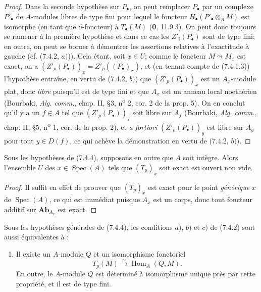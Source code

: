 \begin{proof}
Dans la seconde hypothèse sur $P_\bullet$, on peut remplacer $P_\bullet$ par
un complexe $P'_\bullet$ de
$A$-modules libres de type fini pour lequel le foncteur
$H_\bullet(P'_\bullet\otimes_A M)$ est isomorphe (en tant que
$\partial$-foncteur) à $T_\bullet(M)$ (\textbf{0}, 11.9.3). On peut donc toujours se
ramener à la première hypothèse et dans ce cas les $Z'_i(P_\bullet)$ sont de
type fini; en outre, on peut se borner à démontrer les assertions relatives à
l'exactitude à gauche (cf. (7.4.2, $a)$)). Cela étant, soit $x\in U$; comme le
foncteur $M\leadsto M_x$ est exact, on a
$(Z'_p(P_\bullet))_x=Z'_p((P_\bullet)_x)$,
et (en tenant compte de (7.4.1.3)) l'hypothèse entraîne, en vertu de
(7.4.2, $b)$) que $(Z'_p(P_\bullet))_x$ est un $A_x$-module plat, donc \emph{libre}
puisqu'il est de type fini et que $A_x$ est un anneau local noethérien
(Bourbaki, \emph{Alg. comm.}, chap. II, \S 3, n\textsuperscript{o} 2, cor. 2
de la prop. 5). On en conclut qu'il y a un $f\in A$ tel que
$(Z'_p(P_\bullet))_f$ soit libre sur $A_f$ (Bourbaki, \emph{Alg. comm.},
chap. II, \S 5, n\textsuperscript{o} 1, cor. de la prop. 2), et \emph{a
fortiori} $(Z'_p(P_\bullet))_y$ est libre sur $A_y$ pour tout $y\in D(f)$, ce
qui achève la démonstration en vertu de (7.4.2, $b)$).
\end{proof}

\begin{corollary}[7.4.5]
Sous les hypothèses de \textup{(7.4.4)}, supposons en outre que $A$ soit intègre. Alors
l'ensemble $U$ des $x\in\operatorname{Spec}(A)$ tels que $(T_p)_x$ soit exact
est ouvert non vide.
\end{corollary}

\begin{proof}
Il suffit en effet de prouver que $(T_p)_x$ est exact pour le point \emph{générique}
$x$ de $\operatorname{Spec}(A)$, ce qui est immédiat puisque $A_x$ est un
corps, donc tout foncteur additif sur $\boldsymbol{Ab}_{A_x}$ est exact.
\end{proof}

\begin{proposition}[7.4.6]
Sous les hypothèses générales de \textup{(7.4.4)}, les conditions $a)$, $b)$ et $c)$ \textup{de
(7.4.2)} sont aussi équivalentes à :
\begin{enumerate}
  \item[d)] Il existe un $A$-module $Q$ et un isomorphisme fonctoriel
    \[
      T_p(M)\xrightarrow{\sim}\operatorname{Hom}_A(Q,M).
      \tag{7.4.6.1}\label{III.7.4.6.1.fr}
    \]
    En outre, le $A$-module $Q$ est déterminé à isomorphisme unique près par
    cette propriété, et il est de type fini.
\end{enumerate}
\end{proposition}


